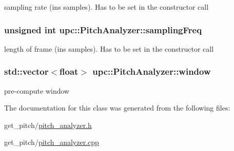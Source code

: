 sampling rate (ins samples). Has to be set in the constructor call 

\subsubsection[{\texorpdfstring{sampling\+Freq}{samplingFreq}}]{\setlength{\rightskip}{0pt plus 5cm}unsigned int upc\+::\+Pitch\+Analyzer\+::sampling\+Freq\hspace{0.3cm}{\ttfamily [private]}}\hypertarget{classupc_1_1PitchAnalyzer_a92578165c78c763749ef5c8aa23b1ca2}{}\label{classupc_1_1PitchAnalyzer_a92578165c78c763749ef5c8aa23b1ca2}


length of frame (ins samples). Has to be set in the constructor call 

\subsubsection[{\texorpdfstring{window}{window}}]{\setlength{\rightskip}{0pt plus 5cm}std\+::vector$<${\bf float}$>$ upc\+::\+Pitch\+Analyzer\+::window\hspace{0.3cm}{\ttfamily [private]}}\hypertarget{classupc_1_1PitchAnalyzer_aa9531a6af11904dca47a18cc22c4bcdd}{}\label{classupc_1_1PitchAnalyzer_aa9531a6af11904dca47a18cc22c4bcdd}


pre-\/compute window 



The documentation for this class was generated from the following files\+:\begin{DoxyCompactItemize}
\item 
get\+\_\+pitch/\hyperlink{pitch__analyzer_8h}{pitch\+\_\+analyzer.\+h}\item 
get\+\_\+pitch/\hyperlink{pitch__analyzer_8cpp}{pitch\+\_\+analyzer.\+cpp}\end{DoxyCompactItemize}
